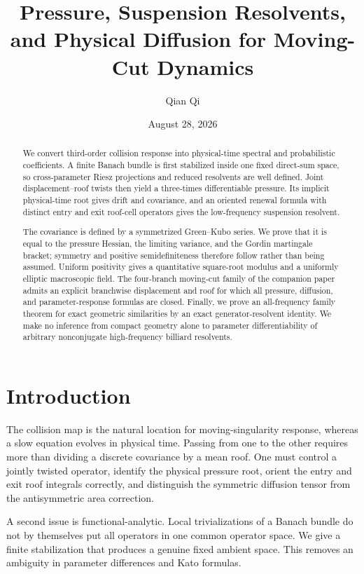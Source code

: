 \documentclass[11pt,reqno]{amsart}
\title[Pressure and physical diffusion]{Pressure, Suspension Resolvents, and Physical Diffusion for Moving-Cut Dynamics}
\author{Qian Qi}
\date{August 28, 2026}
\theoremstyle{definition}
\theoremstyle{remark}
\begin{document}
\begin{abstract}
We convert third-order collision response into physical-time spectral and
probabilistic coefficients.  A finite Banach bundle is first stabilized inside
one fixed direct-sum space, so cross-parameter Riesz projections and reduced
resolvents are well defined.  Joint displacement--roof twists then yield a
three-times differentiable pressure.  Its implicit physical-time root gives
drift and covariance, and an oriented renewal formula with distinct entry and
exit roof-cell operators gives the low-frequency suspension resolvent.

The covariance is defined by a symmetrized Green--Kubo series.  We prove that it
is equal to the pressure Hessian, the limiting variance, and the Gordin
martingale bracket; symmetry and positive semidefiniteness therefore follow
rather than being assumed.  Uniform positivity gives a quantitative square-root
modulus and a uniformly elliptic macroscopic field.  The four-branch moving-cut
family of the companion paper admits an explicit branchwise displacement and
roof for which all pressure, diffusion, and parameter-response formulas are
closed.  Finally, we prove an all-frequency family theorem for exact geometric
similarities by an exact generator-resolvent identity.  We make no inference
from compact geometry alone to parameter differentiability of arbitrary
nonconjugate high-frequency billiard resolvents.
\end{abstract}

\maketitle
\tableofcontents

\section{Introduction}

The collision map is the natural location for moving-singularity response,
whereas a slow equation evolves in physical time.  Passing from one to the
other requires more than dividing a discrete covariance by a mean roof.  One
must control a jointly twisted operator, identify the physical pressure root,
orient the entry and exit roof integrals correctly, and distinguish the
symmetric diffusion tensor from the antisymmetric area correction.

A second issue is functional-analytic.  Local trivializations of a Banach
bundle do not by themselves put all operators in one common operator space.
We give a finite stabilization that produces a genuine fixed ambient space.
This removes an ambiguity in parameter differences and Kato formulas.
\end{document}
